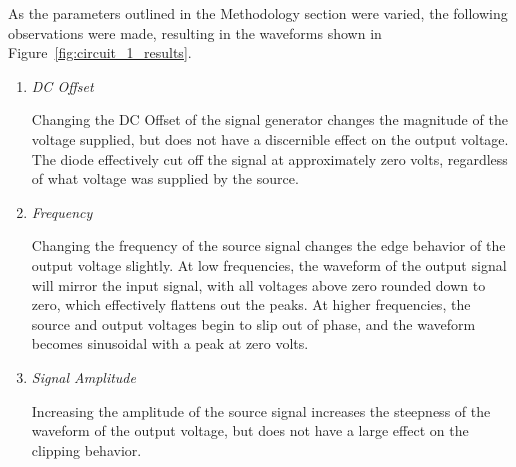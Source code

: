 \documentclass[twocolumn,english]{IEEEtran}
\begin{document}
As the parameters outlined in the Methodology section were varied, the following observations were made, resulting in the waveforms shown in Figure~\ref{fig:circuit_1_results}.
\begin{enumerate}
  \item
    \textit{DC Offset}

    Changing the DC Offset of the signal generator changes the magnitude of the voltage supplied, but does not have a discernible effect on the output voltage. The diode effectively cut off the signal at approximately zero volts, regardless of what voltage was supplied by the source. \\

  \item
    \textit{Frequency}

    Changing the frequency of the source signal changes the edge behavior of the output voltage slightly.
    At low frequencies, the waveform of the output signal will mirror the input signal, with all voltages above zero rounded down to zero, which effectively flattens out the peaks.
    At higher frequencies, the source and output voltages begin to slip out of phase, and the waveform becomes sinusoidal with a peak at zero volts. \\

  \item
    \textit{Signal Amplitude}

    Increasing the amplitude of the source signal increases the steepness of the waveform of the output voltage, but does not have a large effect on the clipping behavior.
\end{enumerate}
\end{document}
